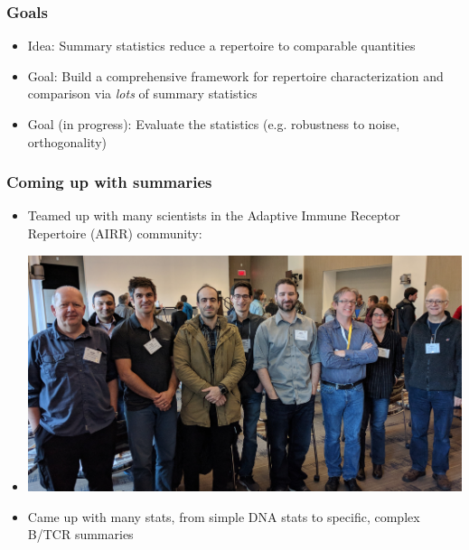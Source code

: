\documentclass[mathserif,compress]{beamer}
\renewcommand\;{\,}
\begin{document}
\begin{frame}\frametitle{Goals}
\begin{itemize}
\item
Idea: Summary statistics reduce a repertoire to comparable quantities
\bigskip
\item
Goal: Build a comprehensive framework for repertoire characterization and comparison via \emph{lots} of summary statistics
\bigskip
\item
Goal (in progress): Evaluate the statistics (e.g. robustness to noise, orthogonality) 
\end{itemize}
\end{frame}

\begin{frame}\frametitle{Coming up with summaries}
\begin{itemize}
\item
Teamed up with many scientists in the Adaptive Immune Receptor Repertoire (AIRR) community:
\bigskip
\item[]
\begin{center}
\includegraphics[width=0.9\linewidth]{Images/AIRR.png}
\end{center}
\bigskip
\item
Came up with many stats, from simple DNA stats to specific, complex B/TCR summaries
\end{itemize}
\end{frame}
\end{document}
